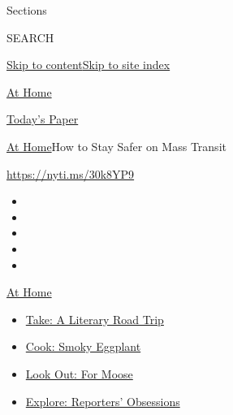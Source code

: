 Sections

SEARCH

\protect\hyperlink{site-content}{Skip to
content}\protect\hyperlink{site-index}{Skip to site index}

\href{https://www.nytimes3xbfgragh.onion/spotlight/at-home}{At Home}

\href{https://myaccount.nytimes3xbfgragh.onion/auth/login?response_type=cookie\&client_id=vi}{}

\href{https://www.nytimes3xbfgragh.onion/section/todayspaper}{Today's
Paper}

\href{/spotlight/at-home}{At Home}\textbar{}How to Stay Safer on Mass
Transit

\url{https://nyti.ms/30k8YP9}

\begin{itemize}
\item
\item
\item
\item
\item
\end{itemize}

\href{https://www.nytimes3xbfgragh.onion/spotlight/at-home?action=click\&pgtype=Article\&state=default\&region=TOP_BANNER\&context=at_home_menu}{At
Home}

\begin{itemize}
\tightlist
\item
  \href{https://www.nytimes3xbfgragh.onion/2020/07/28/books/time-for-a-literary-road-trip.html?action=click\&pgtype=Article\&state=default\&region=TOP_BANNER\&context=at_home_menu}{Take:
  A Literary Road Trip}
\item
  \href{https://www.nytimes3xbfgragh.onion/2020/07/29/magazine/bored-with-your-home-cooking-some-smoky-eggplant-will-fix-that.html?action=click\&pgtype=Article\&state=default\&region=TOP_BANNER\&context=at_home_menu}{Cook:
  Smoky Eggplant}
\item
  \href{https://www.nytimes3xbfgragh.onion/2020/07/27/travel/moose-michigan-isle-royale.html?action=click\&pgtype=Article\&state=default\&region=TOP_BANNER\&context=at_home_menu}{Look
  Out: For Moose}
\item
  \href{https://www.nytimes3xbfgragh.onion/interactive/2020/at-home/even-more-reporters-editors-diaries-lists-recommendations.html?action=click\&pgtype=Article\&state=default\&region=TOP_BANNER\&context=at_home_menu}{Explore:
  Reporters' Obsessions}
\end{itemize}

